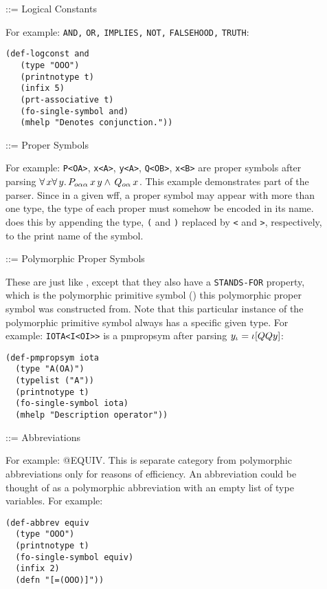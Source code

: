 \begin{description}
\item [ ] ::= Logical Constants

 For example: {\tt AND,} {\tt OR,} {\tt IMPLIES,} {\tt NOT,} {\tt FALSEHOOD,} {\tt TRUTH}:
\begin{verbatim}
(def-logconst and
   (type "OOO")
   (printnotype t)
   (infix 5)
   (prt-associative t)
   (fo-single-symbol and)
   (mhelp "Denotes conjunction."))
\end{verbatim}

\item [ ] ::= Proper Symbols

 For example: {\tt P<OA>}, {\tt x<A>}, {\tt y<A>}, {\tt Q<OB>}, {\tt x<B>} are
proper symbols after parsing
$ \forall \,x \forall \,y . \,P_{o\alpha\alpha} \,x \,y \land \,Q_{o\alpha} \,x$.
This example
demonstrates part of the parser.  Since in a given wff, a proper symbol
may appear with more than one type, the type of each proper must somehow
be encoded in its name.  \TPS does this by appending the type, {\tt (} and
{\tt )} replaced by {\tt <} and {\tt >}, respectively, to the print name of the
symbol.

\item [ ] ::= Polymorphic Proper Symbols

 These are just like , except that they also have 
a {\tt STANDS-FOR} property, which is the polymorphic primitive symbol
() this polymorphic proper symbol was constructed
from.  Note that this particular instance of the polymorphic primitive
symbol always has a specific given type.  For example: {\tt IOTA<I<OI>>}
is a pmpropsym after parsing $y_{\iota} = \iota [QQ y]$:
\begin{verbatim}
(def-pmpropsym iota
  (type "A(OA)")
  (typelist ("A"))
  (printnotype t)
  (fo-single-symbol iota)
  (mhelp "Description operator"))
\end{verbatim}

\item [ ] ::= Abbreviations

 For example: @EQUIV.  This is separate category from polymorphic
abbreviations only for reasons of efficiency.  An abbreviation could
be thought of as a polymorphic abbreviation with an empty list of
type variables. For example:
\begin{verbatim}
(def-abbrev equiv
  (type "OOO")
  (printnotype t)
  (fo-single-symbol equiv)
  (infix 2)
  (defn "[=(OOO)]"))
\end{verbatim}


\end{description}
